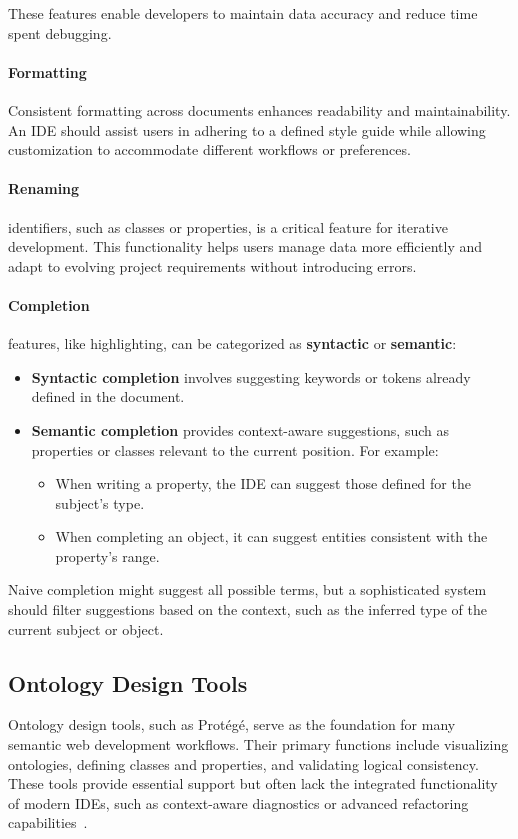 These features enable developers to maintain data accuracy and reduce time spent debugging.


\paragraph*{Formatting}

Consistent formatting across documents enhances readability and maintainability.
An IDE should assist users in adhering to a defined style guide while allowing customization to accommodate different workflows or preferences.

\paragraph*{Renaming} identifiers, such as classes or properties, is a critical feature for iterative development.
This functionality helps users manage data more efficiently and adapt to evolving project requirements without introducing errors.

\paragraph*{Completion} features, like highlighting, can be categorized as \textbf{syntactic} or \textbf{semantic}:

\begin{itemize}
    \item \textbf{Syntactic completion} involves suggesting keywords or tokens already defined in the document.
    \item \textbf{Semantic completion} provides context-aware suggestions, such as properties or classes relevant to the current position. For example:
    \begin{itemize}
        \item When writing a property, the IDE can suggest those defined for the subject's type.
        \item When completing an object, it can suggest entities consistent with the property's range.
    \end{itemize}
\end{itemize}

Naive completion might suggest all possible terms, but a sophisticated system should filter suggestions based on the context, such as the inferred type of the current subject or object.


\subsection*{Ontology Design Tools}

Ontology design tools, such as Protégé, serve as the foundation for many semantic web development workflows. 
Their primary functions include visualizing ontologies, defining classes and properties, and validating logical consistency.
These tools provide essential support but often lack the integrated functionality of modern IDEs, such as context-aware diagnostics or advanced refactoring capabilities~\cite{ComparingOntologyBuildingTools}.


